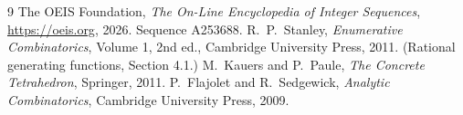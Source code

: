 \documentclass[11pt,a4paper]{article}
\theoremstyle{plain}
\theoremstyle{definition}
\begin{document}
\begin{thebibliography}{9}
 The OEIS Foundation, \emph{The On-Line Encyclopedia of Integer
Sequences}, \url{https://oeis.org}, 2026. Sequence A253688.
 R.~P.~Stanley, \emph{Enumerative Combinatorics}, Volume 1, 2nd ed.,
Cambridge University Press, 2011. (Rational generating functions, Section 4.1.)
 M.~Kauers and P.~Paule, \emph{The Concrete Tetrahedron}, Springer, 2011.
 P.~Flajolet and R.~Sedgewick, \emph{Analytic Combinatorics}, Cambridge
University Press, 2009.
\end{thebibliography}
\end{document}
